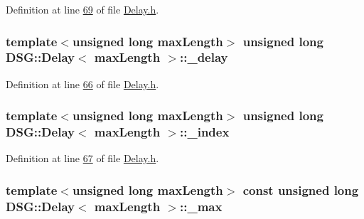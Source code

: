 Definition at line \hyperlink{_delay_8h_source_l00069}{69} of file \hyperlink{_delay_8h_source}{Delay.\+h}.

\hypertarget{class_d_s_g_1_1_delay_aad8790118689ae46c7f434b790358e3f}{
\subsubsection[{\+\_\+delay}]{\setlength{\rightskip}{0pt plus 5cm}template$<$unsigned long max\+Length$>$ unsigned long {\bf D\+S\+G\+::\+Delay}$<$ max\+Length $>$\+::\+\_\+delay\hspace{0.3cm}{\ttfamily [protected]}}}\label{class_d_s_g_1_1_delay_aad8790118689ae46c7f434b790358e3f}


Definition at line \hyperlink{_delay_8h_source_l00066}{66} of file \hyperlink{_delay_8h_source}{Delay.\+h}.

\hypertarget{class_d_s_g_1_1_delay_ac39e72226786a3c43b231b69752431ec}{
\subsubsection[{\+\_\+index}]{\setlength{\rightskip}{0pt plus 5cm}template$<$unsigned long max\+Length$>$ unsigned long {\bf D\+S\+G\+::\+Delay}$<$ max\+Length $>$\+::\+\_\+index\hspace{0.3cm}{\ttfamily [protected]}}}\label{class_d_s_g_1_1_delay_ac39e72226786a3c43b231b69752431ec}


Definition at line \hyperlink{_delay_8h_source_l00067}{67} of file \hyperlink{_delay_8h_source}{Delay.\+h}.

\hypertarget{class_d_s_g_1_1_delay_a1751998677ff85f6580c383e17347d9c}{
\subsubsection[{\+\_\+max}]{\setlength{\rightskip}{0pt plus 5cm}template$<$unsigned long max\+Length$>$ const unsigned long {\bf D\+S\+G\+::\+Delay}$<$ max\+Length $>$\+::\+\_\+max\hspace{0.3cm}{\ttfamily [protected]}}}\label{class_d_s_g_1_1_delay_a1751998677ff85f6580c383e17347d9c}


